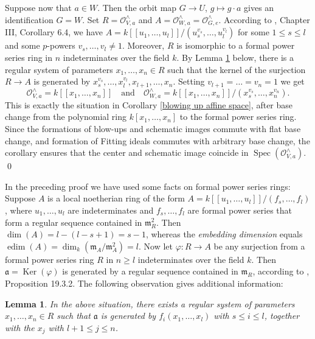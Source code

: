 \documentclass[oneside, 12pt]{amsart}
\newtheorem{lemma}[theorem]{Lemma}
\theoremstyle{definition}
\theoremstyle{remark}
\newcommand{\ideala}{\mathfrak{a}}
\newcommand{\edim}{\operatorname{edim}}
\newcommand{\Kernel}{\operatorname{Ker}}
\newcommand{\maxid}{\mathfrak{m}}
\renewcommand{\O}{\mathscr{O}}
\newcommand{\quadand}{\quad\text{and}\quad}
\newcommand{\ra}{\rightarrow}
\newcommand{\Spec}{\operatorname{Spec}}
\begin{document}
Suppose now that $a\in W$. Then the orbit map $G \to U$, 
$g \mapsto g \cdot a$ gives an identification $G=W$. 
Set $R=\O_{V,a}^\wedge$ and $A=\O_{W,a}^\wedge=\O_{G,e}^\wedge$. 
According to \cite{Demazure; Gabriel 1970}, Chapter III,  Corollary 6.4,
we have $A=k[[u_1,\ldots,u_l]]/(u_s^{v_s},\ldots, u_l^{v_l})$ 
for some $1\leq s\leq l$ and some $p$-powers $v_s,\ldots,v_l\neq 1$.
Moreover, $R$ is isomorphic to a formal power series ring 
in $n$ indeterminates over the field $k$.
By Lemma \ref{complete intersection} below, there is a regular
system of parameters 
$x_1,\ldots,x_n\in R$
such  that the kernel of the surjection $R\ra A$ is generated by $x_s^{v_s},\ldots, x_l^{v_l},x_{l+1},\ldots,x_n$.
Setting $v_{l+1}=\ldots=v_n=1$ we get 
$$
\O_{V,a}^\wedge=k[[x_1,\ldots,x_n]]\quadand \O_{W,a}^\wedge=k[[x_1,\ldots,x_n]]/(x_s^{v_s},\ldots, x_n^{v_n}).
$$
This is exactly  the situation in Corollary \ref{blowing up affine space}, 
after base change from the polynomial ring $k[x_1,\ldots,x_n]$ to the formal power series ring. 
Since the formations of blow-ups and schematic images commute with flat
base change, and formation of Fitting ideals commutes with arbitrary base change, 
the corollary ensures that the center and schematic image coincide in 
$\Spec(\O_{V,a}^\wedge)$. 
\qed

\medskip
In the preceding proof we have used some facts on formal power series rings:
Suppose $A$ is a local noetherian ring of the form $A=k[[u_1,\ldots,u_l]]/(f_s,\ldots,f_l)$,
where $u_1,\ldots, u_l$ are indeterminates  and  $f_s,\ldots,f_l$ are formal power series 
that form a regular sequence contained in   $\maxid_{R}^2$.
Then   $\dim(A)=l-(l-s+1) = s-1$, whereas the \emph{embedding dimension} equals 
$\edim(A)=\dim_k(\maxid_A/\maxid_A^2)=l$.
Now let $\varphi:R\ra A$ be any  surjection from a  formal power series ring $R$   
in $n\geq l$ indeterminates over the field $k$. Then   
$\ideala=\Kernel(\varphi)$ is generated by a regular sequence contained in $\maxid_R$,
according to \cite{EGA IV.4}, Proposition 19.3.2. 
The following observation gives additional information:

\begin{lemma}
\label{complete intersection}
In the above situation, there exists a regular 
system of parameters $x_1,\ldots,x_n\in R$ 
such that $\ideala$ is generated by
$f_i(x_1,\ldots,x_l)$ with $s\leq i\leq l$, together with the $x_j$ with $l+1\leq j\leq n$.
\end{lemma}
\end{document}
